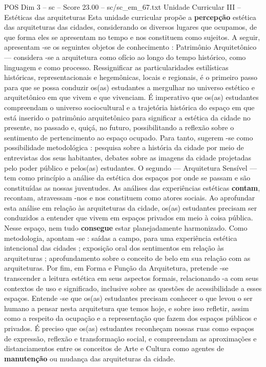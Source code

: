 \begin{textsample}{POS Dim 3 – sc – Score 23.00 – sc/sc\_em\_67.txt}
Unidade Curricular III – Estéticas das arquiteturas Esta unidade curricular propõe a \textbf{percepção} estética das arquiteturas das cidades, considerando os diversos lugares que ocupamos, de que forma eles se apresentam no tempo e nos constituem como sujeitos.
A seguir, apresentam -se os seguintes objetos de conhecimento : Patrimônio Arquitetônico — considera -se a arquitetura como ofício ao longo do tempo histórico, como linguagem e como processo.
Ressignificar as particularidades estilísticas históricas, representacionais e hegemônicas, locais e regionais, é o primeiro passo para que se possa conduzir os(as) estudantes a mergulhar no universo estético e arquitetônico em que vivem e que vivenciam.
É imperativo que os(as) estudantes compreendam o universo sociocultural e a trajetória histórica do espaço em que está inserido o patrimônio arquitetônico para significar a estética da cidade no presente, no passado e, quiçá, no futuro, possibilitando a reflexão sobre o sentimento de pertencimento ao espaço ocupado.
Para tanto, sugerem -se como possibilidade metodológica : pesquisa sobre a história da cidade por meio de entrevistas dos seus habitantes, debates sobre as imagens da cidade projetadas pelo poder público e pelos(as) estudantes.
O segundo — Arquitetura Sensível — tem como princípio a análise da estética dos espaços por onde se passam e são constituídas as nossas juventudes.
As análises das experiências estéticas \textbf{contam}, recontam, atravessam -nos e nos constituem como atores sociais.
Ao aprofundar esta análise em relação às arquiteturas da cidade, os(as) estudantes precisam ser conduzidos a entender que vivem em espaços privados em meio à coisa pública.
Nesse espaço, nem tudo \textbf{consegue} estar planejadamente harmonizado.
Como metodologia, apontam -se : saídas a campo, para uma experiência estética intencional das cidades ; exposição oral dos sentimentos em relação às arquiteturas ; aprofundamento sobre o conceito de belo em sua relação com as arquiteturas.
Por fim, em Forma e Função da Arquitetura, pretende -se transcender a leitura estética em seus aspectos formais, relacionando -a com seus contextos de uso e significado, inclusive sobre as questões de acessibilidade a esses espaços.
Entende -se que os(as) estudantes precisam conhecer o que levou o ser humano a pensar nesta arquitetura que temos hoje, e sobre isso refletir, assim como a respeito da ocupação e a representação que fazem dos espaços públicos e privados.
É preciso que os(as) estudantes reconheçam nossas ruas como espaços de expressão, reflexão e transformação social, e compreendam as aproximações e distanciamentos entre os conceitos de Arte e Cultura como agentes de \textbf{manutenção} ou mudança das arquiteturas da cidade.

\end{textsample}
